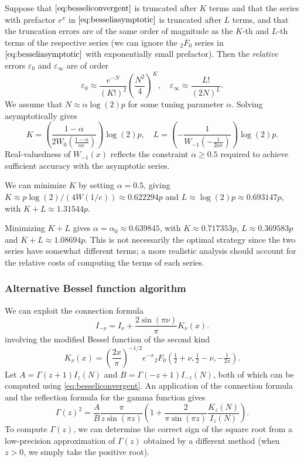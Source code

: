 \documentclass[reqno]{amsart}
\theoremstyle{definition}
\begin{document}
Suppose that $\eqref{eq:besseliconvergent}$ is truncated after $K$ terms
and that the series with prefactor $e^{x}$ in $\eqref{eq:besseliasymptotic}$ is truncated after $L$ terms,
and that the truncation errors are of the same order of magnitude
as the $K$-th and $L$-th terms of the respective series (we can ignore the ${}_2F_0$ series
in $\eqref{eq:besseliasymptotic}$ with exponentially small prefactor).
Then the \emph{relative} errors $\varepsilon_{0}$ and $\varepsilon_{\infty}$
are of order
\begin{equation}
\varepsilon_{0} \approx \frac{e^{-N}}{(K!)^2} \left(\frac{N^2}{4}\right)^K, \quad \varepsilon_{\infty} \approx \frac{L!}{(2N)^L}.
\end{equation}
We assume that $N \approx \alpha \log(2) p$ for some tuning parameter $\alpha$.
Solving asymptotically gives
\begin{equation}
K = \left(\frac{1-\alpha}{2 W_0\!\left(\frac{1-\alpha}{\alpha e}\right)}\right) \log(2) p, \quad
L = \left(-\frac{1}{W_{-1}\!\left(-\frac{1}{2 \alpha e}\right)}\right) \log(2) p.
\end{equation}
Real-valuedness of $W_{-1}(x)$
reflects the constraint $\alpha \ge 0.5$
required to achieve sufficient accuracy with the asymptotic series.

We can minimize $K$ by setting $\alpha = 0.5$, giving
$K \approx p \log(2) / (4 W(1/e)) \approx 0.622294 p$
and $L \approx \log(2) p \approx 0.693147 p$,
with $K + L \approx 1.31544 p$.

Minimizing $K + L$ gives $\alpha = \alpha_0 \approx 0.639845$,
with $K \approx 0.717353 p$, $L \approx 0.369583 p$ and $K + L \approx 1.08694 p$.
This is not necessarily the optimal strategy since the
two series have somewhat different terms; a more
realistic analysis should account for the relative costs
of computing the terms of each series.

\subsubsection{Alternative Bessel function algorithm}
We can exploit the connection formula
\begin{equation}
I_{-\nu} = I_{\nu} +  \frac{2 \sin(\pi \nu)}{\pi} K_{\nu}(x).
\end{equation}
involving the modified Bessel function of the second kind
\begin{equation}
K_{\nu}(x) = \left(\frac{2 x}{\pi}\right)^{-1/2} 
    e^{-x} {}_2F_0\left(\tfrac{1}{2}+\nu, \tfrac{1}{2}-\nu, -\tfrac{1}{2x}\right).
\end{equation}
Let $A = \Gamma(z+1) I_z(N)$ and $B = \Gamma(-z+1) I_{-z}(N)$,
both of which can be computed using \eqref{eq:besseliconvergent}.
An application of the connection formula and
the reflection formula for the gamma function gives
\begin{equation}
\label{eq:gammabessel2}
\Gamma(z)^2 = \frac{A}{B} \frac{\pi}{z \sin(\pi z)} \left(1 + \frac{2}{\pi \sin(\pi z)} \frac{K_z(N)}{I_z(N)}\right).
\end{equation}
To compute $\Gamma(z)$, we can determine the correct
sign of the square root from a low-precision
approximation of $\Gamma(z)$ obtained by a different method
(when $z > 0$, we simply take the positive root).
\end{document}
